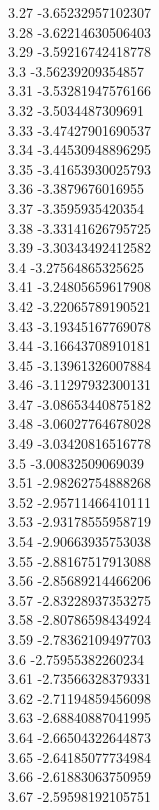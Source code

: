 {3.27	-3.65232957102307\\
3.28	-3.62214630506403\\
3.29	-3.59216742418778\\
3.3	-3.56239209354857\\
3.31	-3.53281947576166\\
3.32	-3.5034487309691\\
3.33	-3.47427901690537\\
3.34	-3.44530948896295\\
3.35	-3.41653930025793\\
3.36	-3.3879676016955\\
3.37	-3.3595935420354\\
3.38	-3.33141626795725\\
3.39	-3.30343492412582\\
3.4	-3.27564865325625\\
3.41	-3.24805659617908\\
3.42	-3.22065789190521\\
3.43	-3.19345167769078\\
3.44	-3.16643708910181\\
3.45	-3.13961326007884\\
3.46	-3.11297932300131\\
3.47	-3.08653440875182\\
3.48	-3.06027764678028\\
3.49	-3.03420816516778\\
3.5	-3.00832509069039\\
3.51	-2.98262754888268\\
3.52	-2.95711466410111\\
3.53	-2.93178555958719\\
3.54	-2.90663935753038\\
3.55	-2.88167517913088\\
3.56	-2.85689214466206\\
3.57	-2.83228937353275\\
3.58	-2.80786598434924\\
3.59	-2.78362109497703\\
3.6	-2.75955382260234\\
3.61	-2.73566328379331\\
3.62	-2.71194859456098\\
3.63	-2.68840887041995\\
3.64	-2.66504322644873\\
3.65	-2.64185077734984\\
3.66	-2.61883063750959\\
3.67	-2.59598192105751\\
}

